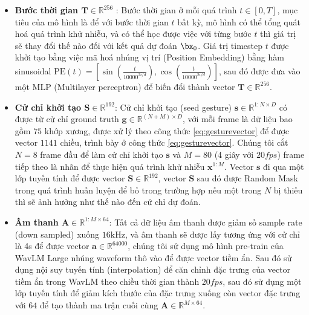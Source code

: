 \begin{itemize}
	\item \textbf{Bước thời gian $\mathbf{T} \in \mathbb{R}^{256}$ }: Bước thời gian ở mỗi quá trình $t \in [0, T]$, mục tiêu của mô hình là để với bước thời gian $t$ bất kỳ, mô hình có thể tổng quát hoá quá trình khử nhiễu, và có thể học được việc với từng bước $t$ thì giá trị sẽ thay đổi thế nào đối với kết quả dự đoán $\bx_0$. Giá trị timestep $t$ được khởi tạo bằng việc mã hoá nhúng vị trí (Position Embedding) bằng hàm sinusoidal $\text{PE}(t) = \left[ \sin{\left(\frac{t}{10000^{2i / d}}\right)}, \cos{\left(\frac{t}{10000^{2i / d}}\right)} \right]$, sau đó được đưa vào một MLP (Multilayer perceptron) để biến đổi thành vector $\mathbf{T}  \in \mathbb{R}^{256}$.
	
	\item \textbf{Cử chỉ khởi tạo $\mathbf{S} \in \mathbb{R}^{192}$}: Cử chỉ khởi tạo (seed gesture) $\mathbf{s} \in \mathbb{R}^{1:N \times D}$ có được từ cử chỉ ground truth $
	\mathbf{g} \in \mathbb{R}^{(N+M) \times D}$, với mỗi frame là dữ liệu bao gồm $75$ khớp xương, được xử lý theo công thức \ref{eq:gesturevector} để được vector $1141$ chiều, trình bày ở công thức \ref{eq:gesturevector}. Chúng tôi cắt $N = 8$ frame đầu để làm cử chỉ khởi tạo $\mathbf{s}$ và $M = 80$ (4 giây với $20fps$) frame tiếp theo là nhãn để thực hiện quá trình khử nhiễu $\mathbf{x}^{1:M}$. Vector $\mathbf{s}$ đi qua một lớp tuyến tính để được vector $\mathbf{S} \in \mathbb{R}^{192}$, vector $\mathbf{S}$ sau đó được Random Mask trong quá trình huấn luyện để bỏ trong trường hợp nếu một trong $N$ bị thiếu thì sẽ ảnh hưởng như thế nào đến cử chỉ dự đoán.
	
  \item \textbf{Âm thanh $\mathbf{A} \in \mathbb{R}^{1:M \times 64}$}: Tất cả dữ liệu âm thanh được giảm số sample rate (down sampled) xuống $16 \mathrm{kHz}$, và âm thanh sẽ được lấy tương ứng với cử chỉ là 4s để được vector $\mathbf{a} \in \mathbb{R}^{64000}$, chúng tôi sử dụng mô hình pre-train của WavLM Large \cite{chen2022wavlm} nhúng waveform thô vào  để được vector tiềm ẩn. Sau đó sử dụng nội suy tuyến tính (interpolation) để căn chỉnh đặc trưng của vector tiềm ẩn trong WavLM theo chiều thời gian thành $20fps$, sau đó sử dụng một lớp tuyến tính để giảm kích thước của đặc trưng xuống còn vector đặc trưng với $64$ để tạo thành ma trận cuối cùng $\mathbf{A} \in \mathbb{R}^{M \times 64}$.
		

\end{itemize}
